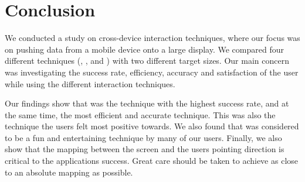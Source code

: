 \section{Conclusion}

We conducted a study on cross-device interaction techniques, where our focus was on pushing data from a mobile device onto a large display.
We compared four different techniques (\pinch, \swipe, \throw and \tilt) with two different target sizes.
Our main concern was investigating the success rate, efficiency, accuracy and satisfaction of the user while using the different interaction techniques.

Our findings show that \swipe was the technique with the highest success rate, and at the same time, the most efficient and accurate technique.
This was also the technique the users felt most positive towards.
We also found that \pinch was considered to be a fun and entertaining technique by many of our users.
Finally, we also show that the mapping between the screen and the users pointing direction is critical to the applications success. 
Great care should be taken to achieve as close to an absolute mapping as possible. 